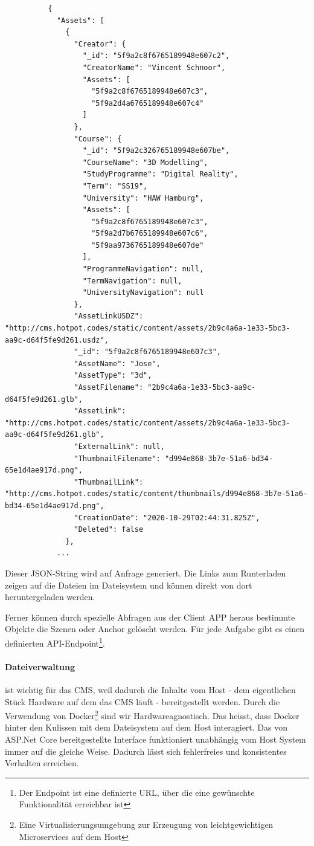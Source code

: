 \documentclass[titlepage, a4paper, 11pt]{scrartcl}
\begin{document}
        \begin{lstlisting}          
          {
            "Assets": [
              {
                "Creator": {
                  "_id": "5f9a2c8f6765189948e607c2",
                  "CreatorName": "Vincent Schnoor",
                  "Assets": [
                    "5f9a2c8f6765189948e607c3",
                    "5f9a2d4a6765189948e607c4"
                  ]
                },
                "Course": {
                  "_id": "5f9a2c326765189948e607be",
                  "CourseName": "3D Modelling",
                  "StudyProgramme": "Digital Reality",
                  "Term": "SS19",
                  "University": "HAW Hamburg",
                  "Assets": [
                    "5f9a2c8f6765189948e607c3",
                    "5f9a2d7b6765189948e607c6",
                    "5f9aa9736765189948e607de"
                  ],
                  "ProgrammeNavigation": null,
                  "TermNavigation": null,
                  "UniversityNavigation": null
                },
                "AssetLinkUSDZ": "http://cms.hotpot.codes/static/content/assets/2b9c4a6a-1e33-5bc3-aa9c-d64f5fe9d261.usdz",
                "_id": "5f9a2c8f6765189948e607c3",
                "AssetName": "Jose",
                "AssetType": "3d",
                "AssetFilename": "2b9c4a6a-1e33-5bc3-aa9c-d64f5fe9d261.glb",
                "AssetLink": "http://cms.hotpot.codes/static/content/assets/2b9c4a6a-1e33-5bc3-aa9c-d64f5fe9d261.glb",
                "ExternalLink": null,
                "ThumbnailFilename": "d994e868-3b7e-51a6-bd34-65e1d4ae917d.png",
                "ThumbnailLink": "http://cms.hotpot.codes/static/content/thumbnails/d994e868-3b7e-51a6-bd34-65e1d4ae917d.png",
                "CreationDate": "2020-10-29T02:44:31.825Z",
                "Deleted": false
              },
            ...
        \end{lstlisting}    
        
        Dieser JSON-String wird auf Anfrage generiert. Die Links zum Runterladen zeigen auf die Dateien im Dateisystem und können direkt von dort heruntergeladen werden.

        Ferner können durch spezielle Abfragen aus der Client APP heraus bestimmte Objekte die Szenen oder Anchor gelöscht werden. 
        Für jede Aufgabe gibt es einen definierten API-Endpoint\footnote{Der Endpoint ist eine definierte URL, über die eine gewünschte Funktionalität erreichbar ist}.

        \paragraph{Dateiverwaltung} ist wichtig für das CMS, weil dadurch die Inhalte vom Host - dem eigentlichen Stück Hardware auf dem das CMS läuft - bereitgestellt werden.
        Durch die Verwendung von Docker\footnote{Eine Virtualisierungsumgebung zur Erzeugung von leichtgewichtigen Microservices auf dem Host} sind wir Hardwareagnostisch.
        Das heisst, dass Docker hinter den Kulissen mit dem Dateisystem auf dem Host interagiert. Das von ASP.Net Core bereitgestellte Interface funktioniert unabhängig
        vom Host System immer auf die gleiche Weise. Dadurch lässt sich fehlerfreies und konsistentes Verhalten erreichen.
\end{document}
